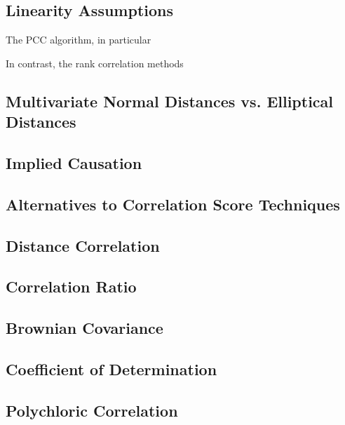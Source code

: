 \subsection{Linearity Assumptions}

The PCC algorithm, in particular

In contrast, the rank correlation methods 

\subsection{Multivariate Normal Distances vs. Elliptical Distances}

\subsection{Implied Causation}

\subsection{Alternatives to Correlation Score Techniques}



\subsection{Distance Correlation}

\subsection{Correlation Ratio}

\subsection{Brownian Covariance}

\subsection{Coefficient of Determination}

\subsection{Polychloric Correlation}